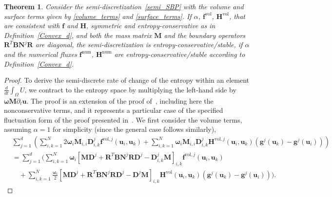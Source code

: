\documentclass[]{scrartcl}
\newcommand{\mtx}[1]{\boldsymbol{#1}}
\renewcommand{\vec}[1]{\boldsymbol{#1}}
\newtheorem{theorem}{Theorem}[section]
\theoremstyle{definition}
\begin{document}
\begin{theorem}
    Consider the semi-discretization~\eqref{semi_SBP} with the volume and surface terms given by \eqref{volume_terms} and \eqref{surface_terms}.
    If $\alpha$, $\vec{f}^{\mathrm{vol}}$, $\vec{H}^{\mathrm{vol}}$, that are consistent with $\vec{f}$ and $\vec{H}$, symmetric and entropy-conservative as in Definition~\ref{Convex_d}, and both the mass matrix $\mtx{M}$ and the boundary operators $\mtx{R}^T \mtx{B} \mtx{N}^j \mtx{R}$ are diagonal, the semi-discretization is entropy-conservative/stable, if $\alpha$ and the numerical fluxes $\vec{f}^{\mathrm{num}}$, $\vec{H}^{\mathrm{num}}$ are entropy-conservative/stable according to Definition~\ref{Convex_d}.
\end{theorem}
\begin{proof}
To derive the semi-discrete rate of change of the entropy within an element $\frac{d}{dt} \int_{\Omega}U$, we contract to the entropy space by multiplying the left-hand side by $\vec{\omega} \mtx{M} \partial_t \vec{u}$.
The proof is an extension of the proof of~\cite{Ranocha2018,FISHER2013518,chen2017entropy}, including here the nonconservative terms, and it represents a particular case of the specified fluctuation form of the proof presented in~\cite{WARUSZEWSKI2022111507}.
We first consider the volume terms, assuming $\alpha = 1$ for simplicity (since the general case follows similarly),
\begin{equation}
\begin{aligned}
  & \sum_{j = 1}^d \left ( \sum_{i, k = 1}^N 2 \vec{\omega}_i \vec{M}_{i,i} \mtx{D}^j_{i,k} \vec{f} ^{\mathrm{vol},j}\left (\vec{u}_i, \vec{u}_k \right )
  + \sum_{i, k = 1}^N \vec{\omega}_i \vec{M}_{i,i} \mtx{D}^j_{i,k} \vec{H}^{\mathrm{vol},j}\left (\vec{u}_i, \vec{u}_k \right ) \left (\vec{g}^j(\vec{u}_k) - \vec{g}^j(\vec{u}_i) \right ) \right ) \\
  & =  \sum_{j = 1}^d \Bigg ( \sum_{i, k = 1}^N \vec{\omega}_i \left [ \mtx{M} \mtx{D}^j + \mtx{R}^T \mtx{B} \mtx{N}^j \mtx{R} \mtx{D}^j - \mtx{D}^j_{i,k} \mtx{M} \right ]_{i,k} \vec{f} ^{\mathrm{vol},j}\left (\vec{u}_i, \vec{u}_k \right ) \\
  &\quad + \sum_{i,k = 1}^N \frac{\vec{\omega}_i}{2} \left [ \mtx{M} \mtx{D}^j + \mtx{R}^T \mtx{B} \mtx{N}^j \mtx{R} \mtx{D}^j - \mtx{D}^j \mtx{M} \right ]_{i,k} \vec{H}^{\mathrm{vol}}\left (\vec{u}_i, \vec{u}_k \right ) \left (\vec{g}^j(\vec{u}_k) - \vec{g}^j(\vec{u}_i) \right ) \Bigg ).
\end{aligned}
\end{equation}

\end{proof}
\end{document}
